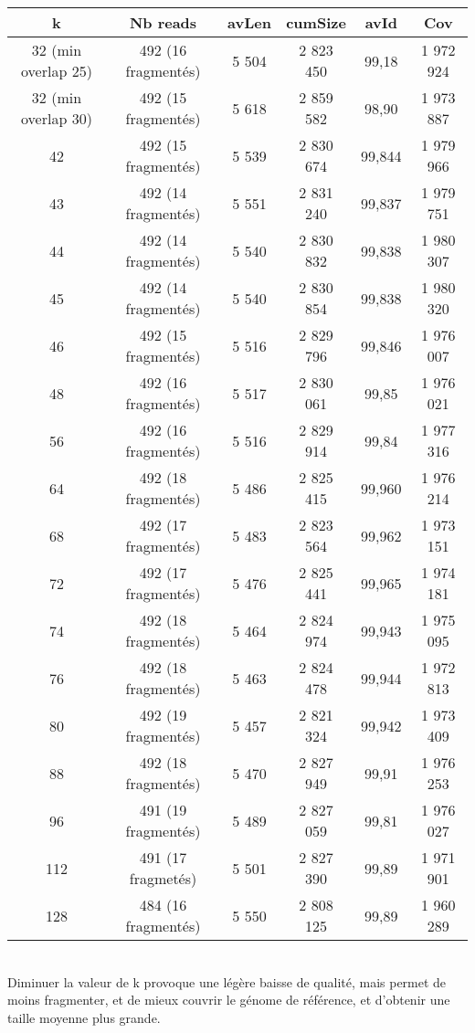 \documentclass[12pt]{article}
\begin{document}
\begin{tabular}{|c|c|c|c|c|c|}
	\hline
	k & Nb reads & avLen & cumSize & avId & Cov \\
	\hline
	32 (min overlap 25) & 492 (16 fragmentés) & 5 504 & 2 823 450 & 99,18 & 1 972 924 \\
	\hline 
	32 (min overlap 30) & 492 (15 fragmentés) & 5 618 & 2 859 582 & 98,90 & 1 973 887 \\
	\hline
	42 & 492 (15 fragmentés) & 5 539 & 2 830 674 & 99,844 & 1 979 966 \\
	\hline
	43 & 492 (14 fragmentés) & 5 551 & 2 831 240 & 99,837 & 1 979 751 \\
	\hline
	44 & 492 (14 fragmentés) & 5 540 & 2 830 832 & 99,838 & 1 980 307 \\
	\hline 
	45 & 492 (14 fragmentés) & 5 540 & 2 830 854 & 99,838 & 1 980 320 \\
	\hline
	46 & 492 (15 fragmentés) & 5 516 & 2 829 796 & 99,846 & 1 976 007 \\
	\hline
	48 & 492 (16 fragmentés) & 5 517 & 2 830 061 & 99,85 & 1 976 021 \\
	\hline
	56 & 492 (16 fragmentés) & 5 516 & 2 829 914 & 99,84 & 1 977 316 \\
	\hline
	64 & 492 (18 fragmentés) & 5 486 & 2 825 415 & 99,960 & 1 976 214 \\
	\hline
	68 & 492 (17 fragmentés) & 5 483 & 2 823 564 & 99,962 & 1 973 151\\
	\hline
	72 & 492 (17 fragmentés) & 5 476 & 2 825 441 & 99,965 & 1 974 181 \\
	\hline
	74 & 492 (18 fragmentés) & 5 464 & 2 824 974 & 99,943 & 1 975 095 \\
	\hline
	76 & 492 (18 fragmentés) & 5 463 & 2 824 478 & 99,944 & 1 972 813 \\
	\hline
	80 & 492 (19 fragmentés) & 5 457 & 2 821 324 & 99,942 & 1 973 409 \\
	\hline
	88 & 492 (18 fragmentés) & 5 470 & 2 827 949 & 99,91 & 1 976 253 \\
	\hline
	96 & 491 (19 fragmentés) & 5 489 & 2 827 059 & 99,81 & 1 976 027 \\
	\hline
	112 & 491 (17 fragmetés) & 5 501 & 2 827 390 & 99,89 & 1 971 901 \\
	\hline
	128 & 484 (16 fragmentés) & 5 550 & 2 808 125 & 99,89 & 1 960 289 \\
	\hline
\end{tabular} \\

Diminuer la valeur de k provoque une légère baisse de qualité, mais permet de moins fragmenter, et de mieux couvrir le génome de référence, et d'obtenir
une taille moyenne plus grande. \\
\end{document}
